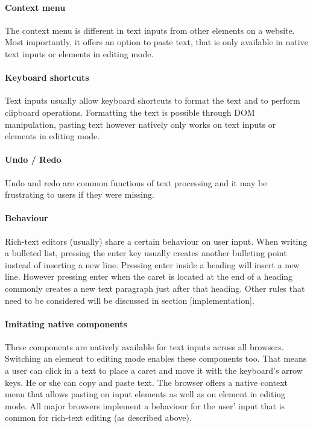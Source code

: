 \paragraph{Context menu} The context menu is different in text inputs from other elements on a website. Most importantly, it offers an option to paste text, that is only available in native text inputs or elements in editing mode.

\paragraph{Keyboard shortcuts} Text inputs usually allow keyboard shortcuts to format the text and to perform clipboard operations. Formatting the text is possible through DOM manipulation, pasting text however natively only works on text inputs or elements in editing mode. %

\paragraph{Undo / Redo} Undo and redo are common functions of text processing and it may be frustrating to users if they were missing.

\paragraph{Behaviour} Rich-text editors (usually) share a certain behaviour on user input. When writing a bulleted list, pressing the enter key usually creates another bulleting point instead of inserting a new line. Pressing enter inside a heading will insert a new line. However pressing enter when the caret is located at the end of a heading commonly creates a new text paragraph just after that heading. Other rules that need to be considered will be discussed in section [implementation].

\paragraph{Imitating native components} These components are natively available for text inputs across all browsers. Switching an element to editing mode enables these components too. That means a user can click in a text to place a caret and move it with the keyboard's arrow keys. He or she can copy and paste text. The browser offers a native context menu that allows pasting on input elements as well as on element in editing mode. All major browsers implement a behaviour for the user' input that is common for rich-text editing (as described above).

